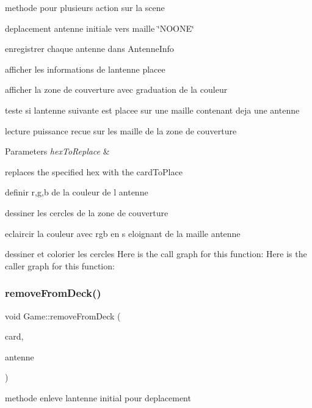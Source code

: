 methode pour plusieurs action sur la scene 


\begin{DoxyEnumerate}
\item deplacement antenne initiale vers maille \char`\"{}\+N\+O\+O\+N\+E\char`\"{}
\item enregistrer chaque antenne dans Antenne\+Info
\item afficher les informations de l\textquotesingle{}antenne placee
\item afficher la zone de couverture avec graduation de la couleur
\item teste si l\textquotesingle{}antenne suivante est placee sur une maille contenant deja une antenne
\item lecture puissance recue sur les maille de la zone de couverture
\end{DoxyEnumerate}


\begin{DoxyParams}{Parameters}
{\em hex\+To\+Replace} & \\
\hline
\end{DoxyParams}
replaces the specified hex with the card\+To\+Place

definir r,g,b de la couleur de l antenne

dessiner les cercles de la zone de couverture

eclaircir la couleur avec rgb en s eloignant de la maille antenne

dessiner et colorier les cercles Here is the call graph for this function\+:
Here is the caller graph for this function\+:
\mbox{\label{class_game_a14fffa93008a1b5ef00ff478c27fc34e}} 
\subsubsection{\texorpdfstring{removeFromDeck()}{removeFromDeck()}}
{\footnotesize\ttfamily void Game\+::remove\+From\+Deck (\begin{DoxyParamCaption}\item[{\mbox{\hyperlink{class_hex}{Hex}} $\ast$}]{card,  }\item[{Q\+String}]{antenne }\end{DoxyParamCaption})}



methode enleve l\textquotesingle{}antenne initial pour deplacement 


